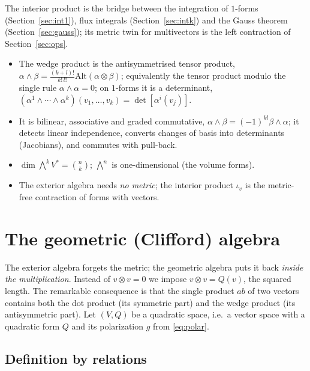 \documentclass[11pt,a4paper]{article}
\numberwithin{equation}{section}
\theoremstyle{definition}
\theoremstyle{plain}
\newcommand{\Alt}{\mathrm{Alt}}                    %
\begin{document}
The interior product is the bridge between the integration of $1$-forms (Section~\ref{sec:int1}), flux integrals (Section~\ref{sec:intk}) and the Gauss theorem (Section~\ref{sec:gauss}); its metric twin for multivectors is the left contraction of Section~\ref{sec:ops}.

\begin{keypoints}
\begin{itemize}
\item The wedge product is the antisymmetrised tensor product, $\alpha\wedge\beta=\frac{(k+l)!}{k!\,l!}\Alt(\alpha\otimes\beta)$; equivalently the tensor product modulo the single rule $\alpha\wedge\alpha=0$; on $1$-forms it is a determinant, $(\alpha^1\wedge\cdots\wedge\alpha^k)(v_1,\dots,v_k)=\det[\alpha^i(v_j)]$.
\item It is bilinear, associative and graded commutative, $\alpha\wedge\beta=(-1)^{kl}\beta\wedge\alpha$; it detects linear independence, converts changes of basis into determinants (Jacobians), and commutes with pull-back.
\item $\dim\bigwedge^kV^*=\binom nk$; $\bigwedge^n$ is one-dimensional (the volume forms).
\item The exterior algebra needs \emph{no metric}; the interior product $\iota_v$ is the metric-free contraction of forms with vectors.
\end{itemize}
\end{keypoints}


\section{The geometric (Clifford) algebra}\label{sec:clifford}

The exterior algebra forgets the metric; the geometric algebra puts it back \emph{inside the multiplication}. Instead of
$v\otimes v=0$ we impose $v\otimes v=Q(v)$, the squared length. The remarkable consequence is that the single product $ab$ of two
vectors contains both the dot product (its symmetric part) and the wedge product (its antisymmetric part).
Let $(V,Q)$ be a quadratic space, i.e.\ a vector space with a quadratic form $Q$ and its polarization $g$ from \eqref{eq:polar}.

\subsection{Definition by relations}
\end{document}
